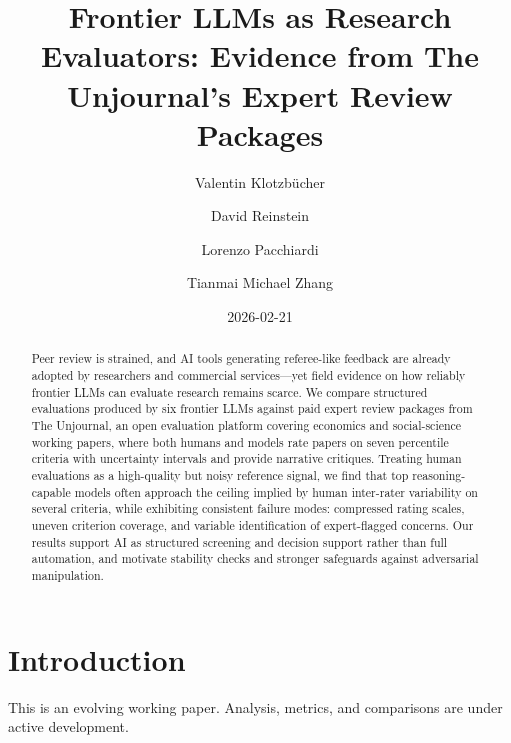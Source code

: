 \documentclass[
  11pt,
  letterpaper,
]{article}
\title{Frontier LLMs as Research Evaluators: Evidence from The
Unjournal's Expert Review Packages}
\author{Valentin Klotzbücher \and David Reinstein \and Lorenzo
Pacchiardi \and Tianmai Michael Zhang}
\date{2026-02-21}
\begin{document}
\maketitle
\begin{abstract}
Peer review is strained, and AI tools generating referee-like feedback
are already adopted by researchers and commercial services---yet field
evidence on how reliably frontier LLMs can evaluate research remains
scarce. We compare structured evaluations produced by six frontier LLMs
against paid expert review packages from The Unjournal, an open
evaluation platform covering economics and social-science working
papers, where both humans and models rate papers on seven percentile
criteria with uncertainty intervals and provide narrative critiques.
Treating human evaluations as a high-quality but noisy reference signal,
we find that top reasoning-capable models often approach the ceiling
implied by human inter-rater variability on several criteria, while
exhibiting consistent failure modes: compressed rating scales, uneven
criterion coverage, and variable identification of expert-flagged
concerns. Our results support AI as structured screening and decision
support rather than full automation, and motivate stability checks and
stronger safeguards against adversarial manipulation.
\end{abstract}



\section{Introduction}\label{introduction}

\begin{tcolorbox}[enhanced jigsaw, left=2mm, colframe=quarto-callout-note-color-frame, bottomrule=.15mm, coltitle=black, leftrule=.75mm, colbacktitle=quarto-callout-note-color!10!white, opacityback=0, arc=.35mm, colback=white, opacitybacktitle=0.6, breakable, title=\textcolor{quarto-callout-note-color}{\faInfo}\hspace{0.5em}{Working paper}, bottomtitle=1mm, rightrule=.15mm, toprule=.15mm, toptitle=1mm, titlerule=0mm]

This is an evolving working paper. Analysis, metrics, and comparisons
are under active development.

\end{tcolorbox}
\end{document}
